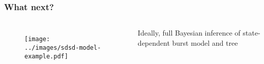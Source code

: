 \begin{frame}[t]
    \frametitle{What next?}

    \vspace{-2mm}
    \begin{columns}[T]

        \begin{minipage}[t][\frametextheight][t]{\columnwidth}
            \begin{figure}
                \begin{center}
                    \texttt{[image: ../images/sdsd-model-example.pdf]}
                \end{center}
            \end{figure}
        \end{minipage}



        \begin{minipage}[c][\frametextheight][c]{\columnwidth}

            Ideally, full Bayesian inference of state-dependent burst model and
            tree

            \bigskip

            \bigskip

        \end{minipage}

    \end{columns}

\end{frame}
